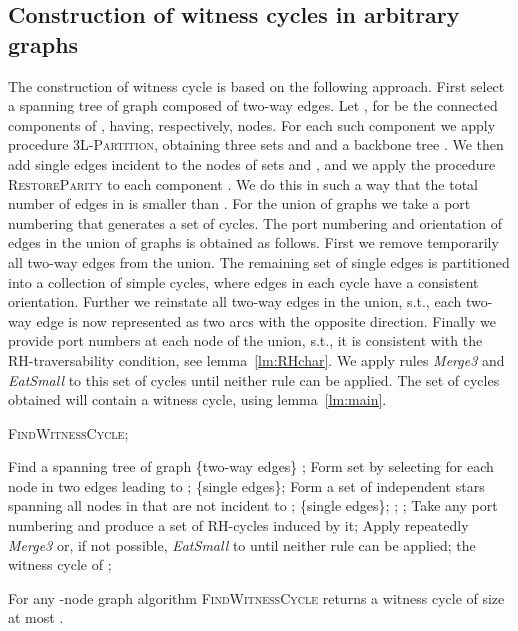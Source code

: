 \documentclass[11pt,envcountsame,oribibl]{llncs}
\begin{document}
\subsection{Construction of witness cycles in arbitrary graphs}
\noindent
The construction of witness
cycle is based on the following approach. First select a spanning tree  of graph 
composed of two-way edges. Let , for  be the connected components
of , having, respectively,  nodes. For each such component we apply
procedure \textsc{3L-Partition}, obtaining three sets  and  and
a backbone tree . We then add single edges incident to the
nodes of sets  and , and we apply the procedure \textsc{RestoreParity}
to each component . We do this in such a way that the total number of edges in
 is smaller than . For the union of graphs
 we take a port numbering
that generates a set of cycles.
The port numbering and orientation of edges in the union of graphs is obtained as follows.
First we remove temporarily all two-way edges from the union.
The remaining set of single edges is partitioned into a collection of simple cycles,
where edges in each cycle have a consistent orientation. Further we reinstate all two-way
edges in the union, s.t., each two-way edge is now represented as two
arcs with the opposite direction. Finally we provide port numbers at each
node of the union, s.t., it is consistent
with the RH-traversability condition, see lemma~\ref{lm:RHchar}.
We apply rules {\em Merge3} and {\em EatSmall} to this set of cycles until neither rule
can be applied. The set of cycles obtained will contain
a witness cycle, using lemma~\ref{lm:main}.

\bigskip{} \textsc{FindWitnessCycle};
\begin{algorithmic}[1]
\STATE Find a spanning tree  of graph  \{two-way edges\}
;
\STATE Form set  by selecting for each node in  two edges
           leading to ; \{single edges\};
\STATE Form a set of independent stars  spanning all nodes in 
that are not incident to ; \{single edges\};
;
\ENDFOR
\STATE ; \label{witness-K}
\STATE Take any port numbering and produce a set
 of RH-cycles induced by it;
\STATE  Apply repeatedly {\em Merge3} or, if not possible, {\em EatSmall} to  until neither rule can be applied;
 the witness cycle of ;
\end{algorithmic}

\begin{theorem}\label{th:4.3}
For any -node graph algorithm \textsc{FindWitnessCycle} returns a
witness cycle of size at most .
\end{theorem}
\end{document}
